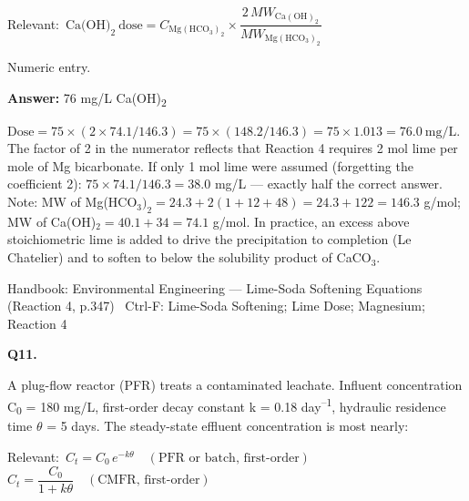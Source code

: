 \documentclass[11pt]{article}
\begin{document}
{\small\color{soft}Relevant:}\ $\text{Ca(OH)}_2\ \text{dose} = C_{\mathrm{Mg(HCO_3)_2}}\times\dfrac{2\,MW_{\mathrm{Ca(OH)_2}}}{MW_{\mathrm{Mg(HCO_3)_2}}}$\par\vspace{3pt}
{\small\color{soft}Numeric entry.}\par\vspace{3pt}
\vspace{2pt}\par\noindent\colorbox{boxbg}{\parbox{\dimexpr\linewidth-2\fboxsep\relax}{%
\vspace{2pt}\textbf{Answer:} 76 mg/L Ca(OH)\textsubscript{2}\par\vspace{2pt}
{\small $\text{Dose} = 75\times(2\times74.1/146.3) = 75\times(148.2/146.3) = 75\times1.013 = 76.0\ \mathrm{mg/L}$. The factor of 2 in the numerator reflects that Reaction 4 requires 2 mol lime per mole of Mg bicarbonate. If only 1 mol lime were assumed (forgetting the coefficient 2): $75\times74.1/146.3 = 38.0$ mg/L --- exactly half the correct answer. Note: MW of Mg(HCO$_3)_2 = 24.3+2(1+12+48) = 24.3+122 = 146.3$ g/mol; MW of Ca(OH)$_2 = 40.1+34 = 74.1$ g/mol. In practice, an excess above stoichiometric lime is added to drive the precipitation to completion (Le Chatelier) and to soften to below the solubility product of CaCO$_3$.}\par\vspace{2pt}
{\footnotesize\color{soft}Handbook: Environmental Engineering --- Lime-Soda Softening Equations (Reaction 4, p.347) \textbullet\ Ctrl-F: Lime-Soda Softening; Lime Dose; Magnesium; Reaction 4}\vspace{2pt}
}}
\vspace{9pt}
\filbreak
\textbf{\color{accent}Q11.}\par\vspace{2pt}
A plug-flow reactor (PFR) treats a contaminated leachate. Influent concentration C\textsubscript{0} = 180 mg/L, first-order decay constant k = 0.18 day\textsuperscript{--}\textsuperscript{1}, hydraulic residence time $\theta$ = 5 days. The steady-state effluent concentration is most nearly:\par\vspace{3pt}
{\small\color{soft}Relevant:}\ $C_t = C_0\,e^{-k\theta}\quad (\text{PFR or batch, first-order})$ \quad $C_t = \dfrac{C_0}{1+k\theta}\quad (\text{CMFR, first-order})$\par\vspace{3pt}
\end{document}
